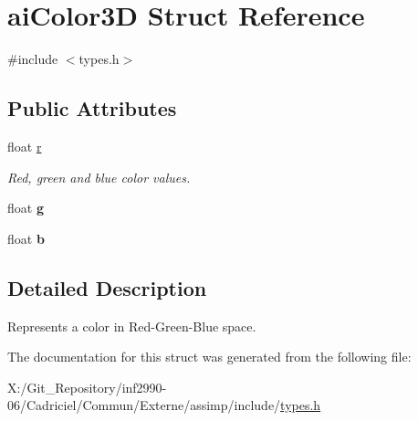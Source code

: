 \hypertarget{structai_color3_d}{\section{ai\-Color3\-D Struct Reference}
\label{structai_color3_d}
}


{\ttfamily \#include $<$types.\-h$>$}

\subsection*{Public Attributes}
\begin{DoxyCompactItemize}
\item 
\hypertarget{structai_color3_d_a0ff704458aa26c84bbfe93b2dd89c630}{float \hyperlink{structai_color3_d_a0ff704458aa26c84bbfe93b2dd89c630}{r}}\label{structai_color3_d_a0ff704458aa26c84bbfe93b2dd89c630}

\begin{DoxyCompactList}\small\item\em Red, green and blue color values. \end{DoxyCompactList}\item 
\hypertarget{structai_color3_d_a40ecdcee92b5373cbaa5e00ebcdb2cfb}{float {\bfseries g}}\label{structai_color3_d_a40ecdcee92b5373cbaa5e00ebcdb2cfb}

\item 
\hypertarget{structai_color3_d_a02ddcc7af11f7d4d6ea14f1bfb4ef6c7}{float {\bfseries b}}\label{structai_color3_d_a02ddcc7af11f7d4d6ea14f1bfb4ef6c7}

\end{DoxyCompactItemize}


\subsection{Detailed Description}
Represents a color in Red-\/\-Green-\/\-Blue space. 

The documentation for this struct was generated from the following file\-:\begin{DoxyCompactItemize}
\item 
X\-:/\-Git\-\_\-\-Repository/inf2990-\/06/\-Cadriciel/\-Commun/\-Externe/assimp/include/\hyperlink{types_8h}{types.\-h}\end{DoxyCompactItemize}
